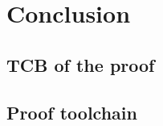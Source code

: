 \section{Conclusion}
\label{Conclusion}

\subsection{TCB of the proof}


\subsection{Proof toolchain}
